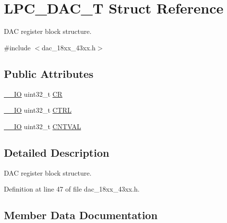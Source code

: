 \hypertarget{struct_l_p_c___d_a_c___t}{}\section{L\+P\+C\+\_\+\+D\+A\+C\+\_\+T Struct Reference}
\label{struct_l_p_c___d_a_c___t}


D\+AC register block structure.  




{\ttfamily \#include $<$dac\+\_\+18xx\+\_\+43xx.\+h$>$}

\subsection*{Public Attributes}
\begin{DoxyCompactItemize}
\item 
\hyperlink{core__sc300_8h_aec43007d9998a0a0e01faede4133d6be}{\+\_\+\+\_\+\+IO} uint32\+\_\+t \hyperlink{struct_l_p_c___d_a_c___t_a9e9bbab757da4f3ef793da168224eb9d}{CR}
\item 
\hyperlink{core__sc300_8h_aec43007d9998a0a0e01faede4133d6be}{\+\_\+\+\_\+\+IO} uint32\+\_\+t \hyperlink{struct_l_p_c___d_a_c___t_a602c1a7a50c8372683c0eef978e2c149}{C\+T\+RL}
\item 
\hyperlink{core__sc300_8h_aec43007d9998a0a0e01faede4133d6be}{\+\_\+\+\_\+\+IO} uint32\+\_\+t \hyperlink{struct_l_p_c___d_a_c___t_adfd515a77f5d9e0e7ca6b6835a996c47}{C\+N\+T\+V\+AL}
\end{DoxyCompactItemize}


\subsection{Detailed Description}
D\+AC register block structure. 

Definition at line 47 of file dac\+\_\+18xx\+\_\+43xx.\+h.



\subsection{Member Data Documentation}
\mbox{\label{struct_l_p_c___d_a_c___t_adfd515a77f5d9e0e7ca6b6835a996c47}} 
